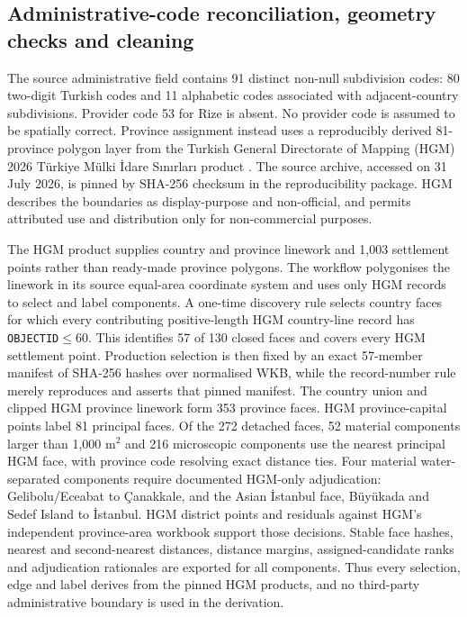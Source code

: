 \documentclass[pdflatex,sn-basic]{sn-jnl}
\begin{document}
\subsection{Administrative-code reconciliation, geometry checks and cleaning}\label{subsec:cleaning}

The source administrative field contains 91 distinct non-null subdivision codes: 80 two-digit Turkish codes and 11 alphabetic codes associated with adjacent-country subdivisions. Provider code 53 for Rize is absent. No provider code is assumed to be spatially correct. Province assignment instead uses a reproducibly derived 81-province polygon layer from the Turkish General Directorate of Mapping (HGM) 2026 Türkiye Mülki İdare Sınırları product \citep{harita_genel_mudurlugu_mulki_2026}. The source archive, accessed on 31 July 2026, is pinned by SHA-256 checksum in the reproducibility package. HGM describes the boundaries as display-purpose and non-official, and permits attributed use and distribution only for non-commercial purposes.

The HGM product supplies country and province linework and 1,003 settlement points rather than ready-made province polygons. The workflow polygonises the linework in its source equal-area coordinate system and uses only HGM records to select and label components. A one-time discovery rule selects country faces for which every contributing positive-length HGM country-line record has \texttt{OBJECTID}$\leq 60$. This identifies 57 of 130 closed faces and covers every HGM settlement point. Production selection is then fixed by an exact 57-member manifest of SHA-256 hashes over normalised WKB, while the record-number rule merely reproduces and asserts that pinned manifest. The country union and clipped HGM province linework form 353 province faces. HGM province-capital points label 81 principal faces. Of the 272 detached faces, 52 material components larger than 1,000 m$^{2}$ and 216 microscopic components use the nearest principal HGM face, with province code resolving exact distance ties. Four material water-separated components require documented HGM-only adjudication: Gelibolu/Eceabat to Çanakkale, and the Asian İstanbul face, Büyükada and Sedef Island to İstanbul. HGM district points and residuals against HGM's independent province-area workbook support those decisions. Stable face hashes, nearest and second-nearest distances, distance margins, assigned-candidate ranks and adjudication rationales are exported for all components. Thus every selection, edge and label derives from the pinned HGM products, and no third-party administrative boundary is used in the derivation.
\end{document}
